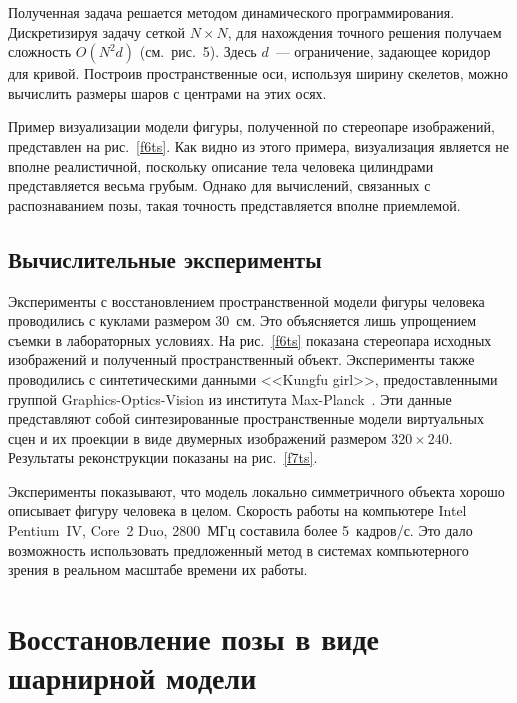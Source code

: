 \begin{multicols}{2}
     Полученная задача решается методом динамического программирования. 
Дискретизируя задачу сеткой $N\times N$, для нахождения точного решения 
получаем сложность $O(N^2d)$ (см.\ рис.~5). Здесь $d$~--- ограничение, 
задающее коридор для кривой. Построив пространственные оси, используя 
ширину скелетов, можно вычислить размеры шаров с центрами на этих осях. 
     

      
Пример визуализации модели фигуры, полученной по стереопаре изображений, 
представлен на рис.~\ref{f6ts}. Как видно из этого примера, визуализация 
является не вполне реалистичной, поскольку описание тела человека 
цилиндрами представляется весьма грубым. Однако для вычислений, 
связанных с распознаванием позы, такая точность представляется вполне 
приемлемой. 

\subsection{Вычислительные эксперименты} %

     Эксперименты с восстановлением пространственной модели фигуры 
человека проводились с куклами размером 30~см. Это объясняется лишь\linebreak 
упрощением съемки в лабораторных условиях. На рис.~\ref{f6ts} показана 
стереопара исходных изоб\-ра\-же\-ний и полученный пространственный объект. 
Эксперименты также проводились с синтетическими данными <<Kungfu 
girl>>, предоставленными группой Graphics-Optics-Vision из института\linebreak 
     Max-Planck~\cite{6ts}. Эти данные представляют собой синтезированные 
пространственные модели виртуальных сцен и их проекции в виде двумерных 
изоб\-ра\-же\-ний размером $320\times 240$. Результаты реконструкции показаны 
на рис.~\ref{f7ts}.



     Эксперименты показывают, что модель локально симметричного объекта 
хорошо описывает фигуру человека в целом. Скорость работы на компьютере 
Intel Pentium~IV, Core~2 Duo, 2800~МГц составила более 5~кадров/с. 
Это дало возможность использовать предложенный метод в системах 
компьютерного зрения в реальном масштабе времени их работы. 
     

\section{Восстановление позы в виде шарнирной модели }


\end{multicols}
